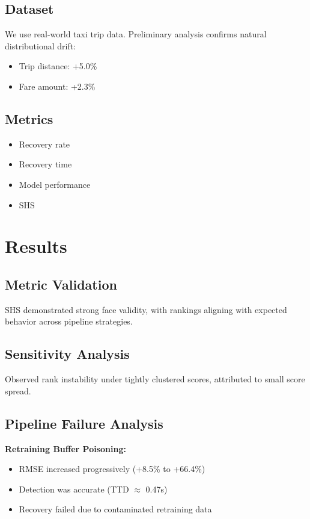 \documentclass[conference]{IEEEtran}
\begin{document}
\subsection{Dataset}
We use real-world taxi trip data. Preliminary analysis confirms natural distributional drift:
\begin{itemize}
    \item Trip distance: +5.0\%
    \item Fare amount: +2.3\%
\end{itemize}

\subsection{Metrics}
\begin{itemize}
    \item Recovery rate
    \item Recovery time
    \item Model performance
    \item SHS
\end{itemize}

\section{Results}

\subsection{Metric Validation}
SHS demonstrated strong face validity, with rankings aligning with expected behavior across pipeline strategies.

\subsection{Sensitivity Analysis}
Observed rank instability under tightly clustered scores, attributed to small score spread.

\subsection{Pipeline Failure Analysis}

\textbf{Retraining Buffer Poisoning:}

\begin{itemize}
    \item RMSE increased progressively (+8.5\% to +66.4\%)
    \item Detection was accurate (TTD $\approx$ 0.47s)
    \item Recovery failed due to contaminated retraining data
\end{itemize}
\end{document}
